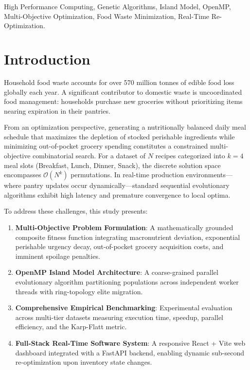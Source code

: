 ﻿\documentclass[conference]{IEEEtran}
\begin{document}
\begin{IEEEkeywords}
High Performance Computing, Genetic Algorithms, Island Model, OpenMP, Multi-Objective Optimization, Food Waste Minimization, Real-Time Re-Optimization.
\end{IEEEkeywords}

\section{Introduction}
Household food waste accounts for over 570 million tonnes of edible food loss globally each year. A significant contributor to domestic waste is uncoordinated food management: households purchase new groceries without prioritizing items nearing expiration in their pantries. 

From an optimization perspective, generating a nutritionally balanced daily meal schedule that maximizes the depletion of stocked perishable ingredients while minimizing out-of-pocket grocery spending constitutes a constrained multi-objective combinatorial search. For a dataset of $N$ recipes categorized into $k=4$ meal slots (Breakfast, Lunch, Dinner, Snack), the discrete solution space encompasses $\mathcal{O}(N^k)$ permutations. In real-time production environments---where pantry updates occur dynamically---standard sequential evolutionary algorithms exhibit high latency and premature convergence to local optima.

To address these challenges, this study presents:
\begin{enumerate}
    \item \textbf{Multi-Objective Problem Formulation}: A mathematically grounded composite fitness function integrating macronutrient deviation, exponential perishable urgency decay, out-of-pocket grocery acquisition costs, and imminent spoilage penalties.
    \item \textbf{OpenMP Island Model Architecture}: A coarse-grained parallel evolutionary algorithm partitioning populations across independent worker threads with ring-topology elite migration.
    \item \textbf{Comprehensive Empirical Benchmarking}: Experimental evaluation across multi-tier datasets measuring execution time, speedup, parallel efficiency, and the Karp-Flatt metric.
    \item \textbf{Full-Stack Real-Time Software System}: A responsive React + Vite web dashboard integrated with a FastAPI backend, enabling dynamic sub-second re-optimization upon inventory state changes.
\end{enumerate}
\end{document}
